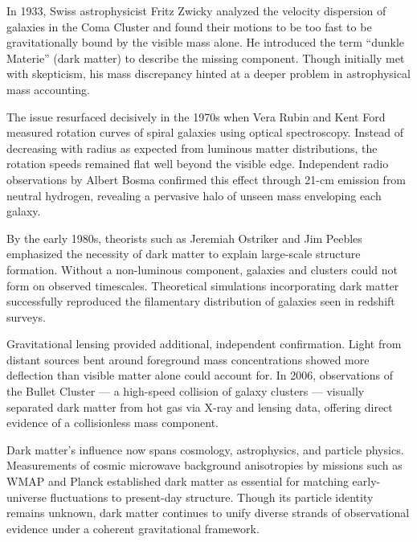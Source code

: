 \begin{historical}
In 1933, Swiss astrophysicist Fritz Zwicky analyzed the velocity dispersion of galaxies in the Coma Cluster and found their motions to be too fast to be gravitationally bound by the visible mass alone. He introduced the term “dunkle Materie” (dark matter) to describe the missing component. Though initially met with skepticism, his mass discrepancy hinted at a deeper problem in astrophysical mass accounting.

The issue resurfaced decisively in the 1970s when Vera Rubin and Kent Ford measured rotation curves of spiral galaxies using optical spectroscopy. Instead of decreasing with radius as expected from luminous matter distributions, the rotation speeds remained flat well beyond the visible edge. Independent radio observations by Albert Bosma confirmed this effect through 21-cm emission from neutral hydrogen, revealing a pervasive halo of unseen mass enveloping each galaxy.

By the early 1980s, theorists such as Jeremiah Ostriker and Jim Peebles emphasized the necessity of dark matter to explain large-scale structure formation. Without a non-luminous component, galaxies and clusters could not form on observed timescales. Theoretical simulations incorporating dark matter successfully reproduced the filamentary distribution of galaxies seen in redshift surveys.

Gravitational lensing provided additional, independent confirmation. Light from distant sources bent around foreground mass concentrations showed more deflection than visible matter alone could account for. In 2006, observations of the Bullet Cluster — a high-speed collision of galaxy clusters — visually separated dark matter from hot gas via X-ray and lensing data, offering direct evidence of a collisionless mass component.

Dark matter’s influence now spans cosmology, astrophysics, and particle physics. Measurements of cosmic microwave background anisotropies by missions such as WMAP and Planck established dark matter as essential for matching early-universe fluctuations to present-day structure. Though its particle identity remains unknown, dark matter continues to unify diverse strands of observational evidence under a coherent gravitational framework.
\end{historical}

